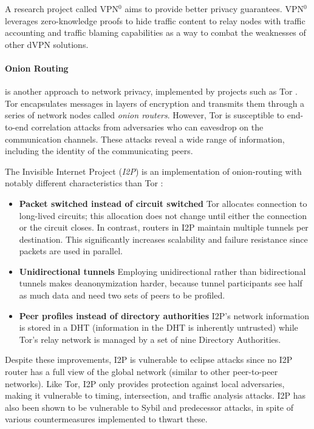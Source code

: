 A research project called VPN$^0$ \cite{vpn0} aims to provide better privacy guarantees. VPN$^0$ leverages zero-knowledge proofs to hide traffic content to relay nodes with traffic accounting and traffic blaming capabilities as a way to combat the weaknesses of other dVPN solutions.

\paragraph{Onion Routing} is another approach to network privacy, implemented by projects such as Tor \cite{tor}. Tor encapsulates messages in layers of encryption and transmits them through a series of network nodes called \textit{onion routers}. However, Tor is susceptible to end-to-end correlation attacks from adversaries who can eavesdrop on the communication channels. These attacks reveal a wide range of information, including the identity of the communicating peers.

The Invisible Internet Project (\textit{I2P}) is an implementation of onion-routing with notably different characteristics than Tor \cite{i2p}:

\begin{itemize}

      \item \textbf{Packet switched instead of circuit switched}
            Tor allocates connection to long-lived circuits; this allocation does not change until either the connection or the circuit closes. In contrast, routers in I2P maintain multiple tunnels per destination. This significantly increases scalability and failure resistance since packets are used in parallel.

      \item \textbf{Unidirectional tunnels}
            Employing unidirectional rather than bidirectional tunnels makes deanonymization harder, because tunnel participants see half as much data and need two sets of peers to be profiled.

      \item \textbf{Peer profiles instead of directory authorities}
            I2P’s network information is stored in a DHT (information in the DHT is inherently untrusted) while Tor’s relay network is managed by a set of nine Directory Authorities.
\end{itemize}

Despite these improvements, I2P is vulnerable to eclipse attacks since no I2P router has a full view of the global network (similar to other peer-to-peer networks). Like Tor, I2P only provides protection against local adversaries, making it vulnerable to timing, intersection, and traffic analysis attacks. I2P has also been shown to be vulnerable to Sybil and predecessor attacks, in spite of various countermeasures implemented to thwart these.

